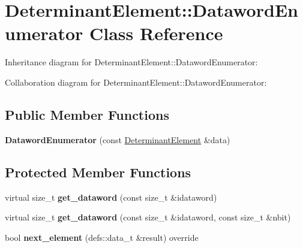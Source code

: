 \hypertarget{classDeterminantElement_1_1DatawordEnumerator}{}\section{Determinant\+Element\+:\+:Dataword\+Enumerator Class Reference}
\label{classDeterminantElement_1_1DatawordEnumerator}


Inheritance diagram for Determinant\+Element\+:\+:Dataword\+Enumerator\+:


Collaboration diagram for Determinant\+Element\+:\+:Dataword\+Enumerator\+:
\subsection*{Public Member Functions}
\begin{DoxyCompactItemize}
\item 
{\bfseries Dataword\+Enumerator} (const \hyperlink{classDeterminantElement}{Determinant\+Element} \&data)\hypertarget{classDeterminantElement_1_1DatawordEnumerator_a17237d87203d5ad9874dd2326858f061}{}\label{classDeterminantElement_1_1DatawordEnumerator_a17237d87203d5ad9874dd2326858f061}

\end{DoxyCompactItemize}
\subsection*{Protected Member Functions}
\begin{DoxyCompactItemize}
\item 
virtual size\+\_\+t {\bfseries get\+\_\+dataword} (const size\+\_\+t \&idataword)\hypertarget{classDeterminantElement_1_1DatawordEnumerator_ae38acfbe1b6c240511f2c683b80abecb}{}\label{classDeterminantElement_1_1DatawordEnumerator_ae38acfbe1b6c240511f2c683b80abecb}

\item 
virtual size\+\_\+t {\bfseries get\+\_\+dataword} (const size\+\_\+t \&idataword, const size\+\_\+t \&nbit)\hypertarget{classDeterminantElement_1_1DatawordEnumerator_a12c2391ace451e06c881897c5b4079ac}{}\label{classDeterminantElement_1_1DatawordEnumerator_a12c2391ace451e06c881897c5b4079ac}

\item 
bool {\bfseries next\+\_\+element} (defs\+::data\+\_\+t \&result) override\hypertarget{classDeterminantElement_1_1DatawordEnumerator_a8d7af22fcc9e1b15a2989e48f2fb0988}{}\label{classDeterminantElement_1_1DatawordEnumerator_a8d7af22fcc9e1b15a2989e48f2fb0988}

\end{DoxyCompactItemize}
